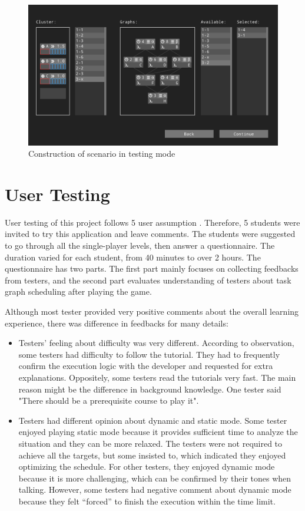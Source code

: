 \documentclass[msc,deptreport, cs]{infthesis}
\begin{document}
\begin{figure}[!htb]
  \centering
  \includegraphics[width=\columnwidth]{play3.png}
  \caption{Construction of scenario in testing mode}
  \label{fig:play3}
\end{figure}

\chapter{User Testing} \label{sec:testing}

User testing of this project follows 5 user assumption \cite{Virzi1992}. Therefore, 5 students were invited to try this application and leave comments. The students were suggested to go through all the single-player levels, then answer a questionnaire. The duration varied for each student, from 40 minutes to over 2 hours. The questionnaire has two parts. The first part mainly focuses on collecting feedbacks from testers, and the second part evaluates understanding of testers about task graph scheduling after playing the game.

Although most tester provided very positive comments about the overall learning experience, there was difference in feedbacks for many details:
\begin{itemize}
  \item Testers' feeling about difficulty was very different. According to observation, some testers had difficulty to follow the tutorial. They had to frequently confirm the execution logic with the developer and requested for extra explanations. Oppositely, some testers read the tutorials very fast. The main reason might be the difference in background knowledge. One tester said "There should be a prerequisite course to play it".
  \item Testers had different opinion about dynamic and static mode. Some tester enjoyed playing static mode because it provides sufficient time to analyze the situation and they can be more relaxed. The testers were not required to achieve all the targets, but some insisted to, which indicated they enjoyed optimizing the schedule. For other testers, they enjoyed dynamic mode because it is more challenging, which can be confirmed by their tones when talking. However, some testers had negative comment about dynamic mode because they felt ``forced'' to finish the execution within the time limit. 
\end{itemize}
\end{document}
